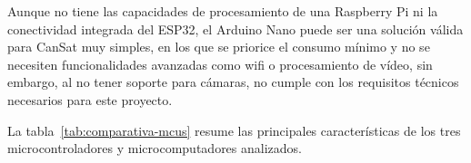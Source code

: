 \begin{itemize}
    Aunque no tiene las capacidades de procesamiento de una Raspberry Pi ni la conectividad integrada del ESP32, el Arduino Nano puede ser una solución válida para CanSat muy simples,
    en los que se priorice el consumo mínimo y no se necesiten funcionalidades avanzadas como wifi o procesamiento de vídeo, sin embargo, al no tener soporte para cámaras,
    no cumple con los requisitos técnicos necesarios para este proyecto.

\end{itemize}
La tabla~\ref{tab:comparativa-mcus} resume las principales características de los tres microcontroladores y microcomputadores analizados.

\begin{table}[h]
    \centering
    \footnotesize
    \caption{Comparativa de microcontroladores y microcomputadores}
    \label{tab:comparativa-mcus}
\end{table}


